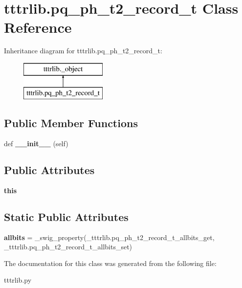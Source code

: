 \hypertarget{classtttrlib_1_1pq__ph__t2__record__t}{}\section{tttrlib.\+pq\+\_\+ph\+\_\+t2\+\_\+record\+\_\+t Class Reference}
\label{classtttrlib_1_1pq__ph__t2__record__t}
Inheritance diagram for tttrlib.\+pq\+\_\+ph\+\_\+t2\+\_\+record\+\_\+t\+:\begin{figure}[H]
\begin{center}
\leavevmode
\includegraphics[height=2.000000cm]{classtttrlib_1_1pq__ph__t2__record__t}
\end{center}
\end{figure}
\subsection*{Public Member Functions}
\begin{DoxyCompactItemize}
\item 
\mbox{\label{classtttrlib_1_1pq__ph__t2__record__t_af2a37daac84c40e8f45583fd8ec00264}} 
def {\bfseries \+\_\+\+\_\+init\+\_\+\+\_\+} (self)
\end{DoxyCompactItemize}
\subsection*{Public Attributes}
\begin{DoxyCompactItemize}
\item 
\mbox{\label{classtttrlib_1_1pq__ph__t2__record__t_a01fe6faa496b813ccbace6f691a73812}} 
{\bfseries this}
\end{DoxyCompactItemize}
\subsection*{Static Public Attributes}
\begin{DoxyCompactItemize}
\item 
\mbox{\label{classtttrlib_1_1pq__ph__t2__record__t_a54b5c0f0b6d9969fba2d118ec4bc2ec9}} 
{\bfseries allbits} = \+\_\+swig\+\_\+property(\+\_\+tttrlib.\+pq\+\_\+ph\+\_\+t2\+\_\+record\+\_\+t\+\_\+allbits\+\_\+get, \+\_\+tttrlib.\+pq\+\_\+ph\+\_\+t2\+\_\+record\+\_\+t\+\_\+allbits\+\_\+set)
\end{DoxyCompactItemize}


The documentation for this class was generated from the following file\+:\begin{DoxyCompactItemize}
\item 
tttrlib.\+py\end{DoxyCompactItemize}
